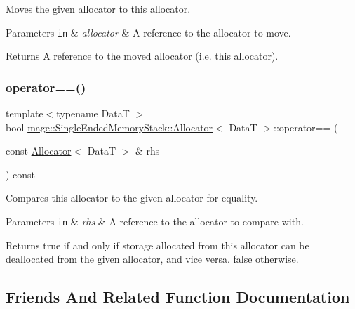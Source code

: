 Moves the given allocator to this allocator.


\begin{DoxyParams}[1]{Parameters}
\mbox{\tt in}  & {\em allocator} & A reference to the allocator to move. \\
\hline
\end{DoxyParams}
\begin{DoxyReturn}{Returns}
A reference to the moved allocator (i.\+e. this allocator). 
\end{DoxyReturn}
\hypertarget{structmage_1_1_single_ended_memory_stack_1_1_allocator_a9ef3d489b794331df54dbba0de0aa6ce}{}\label{structmage_1_1_single_ended_memory_stack_1_1_allocator_a9ef3d489b794331df54dbba0de0aa6ce} 
\subsubsection{\texorpdfstring{operator==()}{operator==()}}
{\footnotesize\ttfamily template$<$typename DataT $>$ \\
bool \hyperlink{structmage_1_1_single_ended_memory_stack_1_1_allocator}{mage\+::\+Single\+Ended\+Memory\+Stack\+::\+Allocator}$<$ DataT $>$\+::operator== (\begin{DoxyParamCaption}\item[{const \hyperlink{structmage_1_1_single_ended_memory_stack_1_1_allocator}{Allocator}$<$ DataT $>$ \&}]{rhs }\end{DoxyParamCaption}) const\hspace{0.3cm}{\ttfamily [noexcept]}}

Compares this allocator to the given allocator for equality.


\begin{DoxyParams}[1]{Parameters}
\mbox{\tt in}  & {\em rhs} & A reference to the allocator to compare with. \\
\hline
\end{DoxyParams}
\begin{DoxyReturn}{Returns}
{\ttfamily true} if and only if storage allocated from this allocator can be deallocated from the given allocator, and vice versa. {\ttfamily false} otherwise. 
\end{DoxyReturn}


\subsection{Friends And Related Function Documentation}
\hypertarget{structmage_1_1_single_ended_memory_stack_1_1_allocator_a3f3449e5c2caa1666a293b36db6f5a54}{}\label{structmage_1_1_single_ended_memory_stack_1_1_allocator_a3f3449e5c2caa1666a293b36db6f5a54} 
